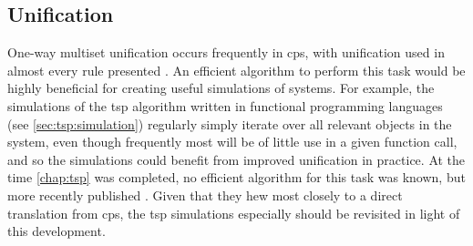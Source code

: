 \subsection{Unification}


One-way multiset unification occurs frequently in \gls{cps}, with unification used in almost every rule presented .  An efficient algorithm to perform this task would be highly beneficial for creating useful simulations of systems.  For example, the simulations of the \gls{tsp} algorithm written in functional programming languages (see \vref{sec:tsp:simulation}) regularly simply iterate over all relevant objects in the system, even though frequently most will be of little use in a given function call, and so the simulations could benefit from improved unification in practice.  At the time \cref{chap:tsp} was completed, no efficient algorithm for this task was known, but more recently \citeauthor{Liu2021} published  \cite{Liu2021}.  Given that they hew most closely to a direct translation from \gls{cps}, the \gls{tsp} simulations especially should be revisited in light of this development.



